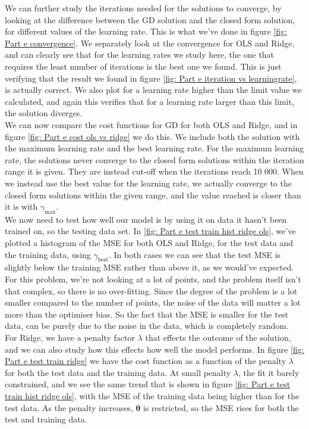 \documentclass[reprint,english,notitlepage]{revtex4-2}  %
\begin{document}
We can further study the iterations needed for the solutions to converge, by looking at the difference between the GD solution and the closed form solution, for different values of the learning rate. This is what we've done in figure \ref{fig: Part e convergence}. We separately look at the convergence for OLS and Ridge, and can clearly see that for the learning rates we study here, the one that requires the least number of iterations is the best one we found. This is just verifying that the result we found in figure \ref{fig: Part e iteration vs learningrate}, is actually correct. We also plot for a learning rate higher than the limit value we calculated, and again this verifies that for a learning rate larger than this limit, the solution diverges. \\
We can now compare the cost functions for GD for both OLS and Ridge, and in figure \ref{fig: Part e cost ols vs ridge} we do this. We include both the solution with the maximum learning rate and the best learning rate. For the maximum learning rate, the solutions never converge to the closed form solutions within the iteration range it is given. They are instead cut-off when the iterations reach 10 000. When we instead use the best value for the learning rate, we actually converge to the closed form solutions within the given range, and the value reached is closer than it is with $\gamma_{\text{max}}$. \\
We now need to test how well our model is by using it on data it hasn't been trained on, so the testing data set. In \ref{fig: Part e test train hist ridge ols}, we've plotted a histogram of the MSE for both OLS and Ridge, for the test data and the training data, using $\gamma_{\text{best}}$. In both cases we can see that the test MSE is slightly below the training MSE rather than above it, as we would've expected. For this problem, we're not looking at a lot of points, and the problem itself isn't that complex, so there is no over-fitting. Since the degree of the problem is a lot smaller compared to the number of points, the noise of the data will matter a lot more than the optimiser bias. So the fact that the MSE is smaller for the test data, can be purely due to the noise in the data, which is completely random. \\
For Ridge, we have a penalty factor $\lambda$ that effects the outcome of the solution, and we can also study how this effects how well the model performs. In figure \ref{fig: Part e test train ridge} we have the cost function as a function of the penalty $\lambda$ for both the test data and the training data. At small penalty $\lambda$, the fit it barely constrained, and we see the same trend that is shown in figure \ref{fig: Part e test train hist ridge ols}, with the MSE of the training data being higher than for the test data. As the penalty increases, $\bm{\theta}$ is restricted, so the MSE rises for both the test and training data. 
\end{document}
